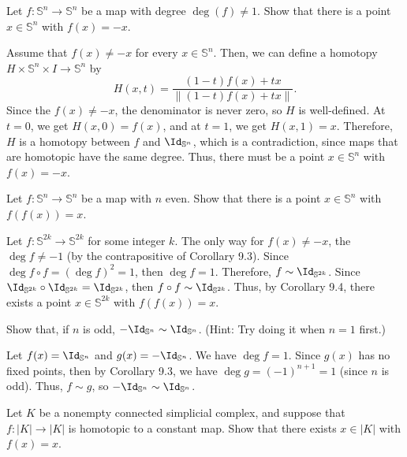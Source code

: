 \renewcommand\S{\mathbb{S}}

\begin{problem}[1]
  Let $f : \S^n \to \S^n$ be a map with degree $\deg(f) \ne 1$. Show that there is a point $x \in \S^n$ with $f(x) = -x$.
\end{problem}

\begin{solution}
  Assume that $f(x) \ne -x$ for every $x \in \S^n$. Then, we can define a homotopy $H \times \S^n \times I \to \S^n$ by
  \[%
    H(x, t) = \frac{(1 - t)f(x) + tx}{\|(1 - t)f(x) + tx\|}
  .\]%
  Since the $f(x) \ne -x$, the denominator is never zero, so $H$ is well-defined. At $t = 0$, we get $H(x, 0) = f(x)$, and at $t = 1$, we get $H(x, 1) = x$. Therefore, $H$ is a homotopy between $f$ and $\Id_{\S^n}$, which is a contradiction, since maps that are homotopic have the same degree. Thus, there must be a point $x \in \S^n$ with $f(x) = -x$.
\end{solution}

\begin{problem}[2]
  Let $f : \S^n \to \S^n$ be a map with $n$ even. Show that there is a point $x \in \S^n$ with $f(f(x)) = x$.
\end{problem}

\begin{solution}
  Let $f : \S^{2k} \to \S^{2k}$ for some integer $k$. The only way for $f(x) \ne -x$, the $\deg f \ne -1$ (by the contrapositive of Corollary 9.3). Since $\deg f \circ f = (\deg f)^2 = 1$, then $\deg f = 1$. Therefore, $f \sim \Id_{\S^{2k}}$. Since $\Id_{\S^{2k}} \circ \Id_{\S^{2k}} = \Id_{\S^{2k}}$, then $f \circ f \sim \Id_{\S^{2k}}$. Thus, by Corollary 9.4, there exists a point $x \in \S^{2k}$ with $f(f(x)) = x$.
\end{solution}

\begin{problem}[3]
  Show that, if $n$ is odd, $-\Id_{\S^n} \sim \Id_{\S^n}$. (Hint: Try doing it when $n = 1$ first.)
\end{problem}

\begin{solution}
  Let $f(x) = \Id_{\S^n}$ and $g(x) = -\Id_{\S^n}$. We have $\deg f = 1$. Since $g(x)$ has no fixed points, then by Corollary 9.3, we have $\deg g = (-1)^{n + 1} = 1$ (since $n$ is odd). Thus, $f \sim g$, so $-\Id_{\S^n} \sim \Id_{\S^n}$.
\end{solution}

\begin{problem}[4]
  Let $K$ be a nonempty connected simplicial complex, and suppose that $f : |K| \to |K|$ is homotopic to a constant map. Show that there exists $x \in |K|$ with $f(x) = x$.
\end{problem}

